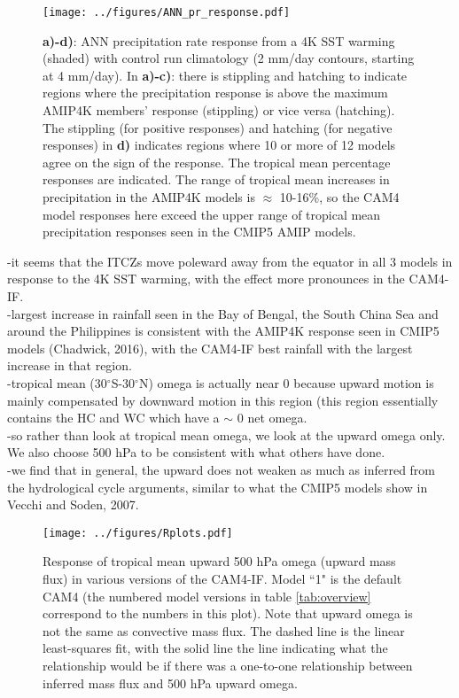 \documentclass[letterpaper,12pt,titlepage,oneside,final]{book}
\begin{document}
\begin{figure}[H]
\centering
\noindent\texttt{[image: ../figures/ANN\_pr\_response.pdf]}\hfill
\caption{\textbf{a)-d)}: ANN precipitation rate response from a 4K SST warming (shaded) with control run climatology (2 mm/day contours, starting at 4 mm/day). In \textbf{a)-c)}: there is stippling and hatching to indicate regions where the precipitation response is above the maximum AMIP4K members' response (stippling) or vice versa (hatching). The stippling (for positive responses) and hatching (for negative responses) in \textbf{d)} indicates regions where 10 or more of 12 models agree on the sign of the response. The tropical mean percentage responses are indicated. The range of tropical mean increases in precipitation in the AMIP4K models is $\approx$ 10-16\%, so the CAM4 model responses here exceed the upper range of tropical mean precipitation responses seen in the CMIP5 AMIP models.}
\end{figure}
-it seems that the ITCZs move poleward away from the equator in all 3 models in response to the 4K SST warming, with the effect more pronounces in the CAM4-IF.
\\
-largest increase in rainfall seen in the Bay of Bengal, the South China Sea and around the Philippines is consistent with the AMIP4K response seen in CMIP5 models (Chadwick, 2016), with the CAM4-IF best rainfall with the largest increase in that region.
\\
-tropical mean (30$^\circ$S-30$^\circ$N) omega is actually near 0 because upward motion is mainly compensated by downward motion in this region (this region essentially contains the HC and WC which have a $\sim$ 0 net omega.
\\
-so rather than look at tropical mean omega, we look at the upward omega only. We also choose 500 hPa to be consistent with what others have done.
\\
-we find that in general, the upward does not weaken as much as inferred from the hydrological cycle arguments, similar to what the CMIP5 models show in Vecchi and Soden, 2007.
\begin{figure}[H]
\centering
\noindent\texttt{[image: ../figures/Rplots.pdf]}\hfill
\caption{Response of tropical mean upward 500 hPa omega (upward mass flux) in various versions of the CAM4-IF. Model ``1" is the default CAM4 (the numbered model versions in table \ref{tab:overview} correspond to the numbers in this plot). Note that upward omega is not the same as convective mass flux. The dashed line is the linear least-squares fit, with the solid line the line indicating what the relationship would be if there was a  one-to-one relationship between inferred mass flux and 500 hPa upward omega.}
\label{fig:vecchi}
\end{figure}
\end{document}
